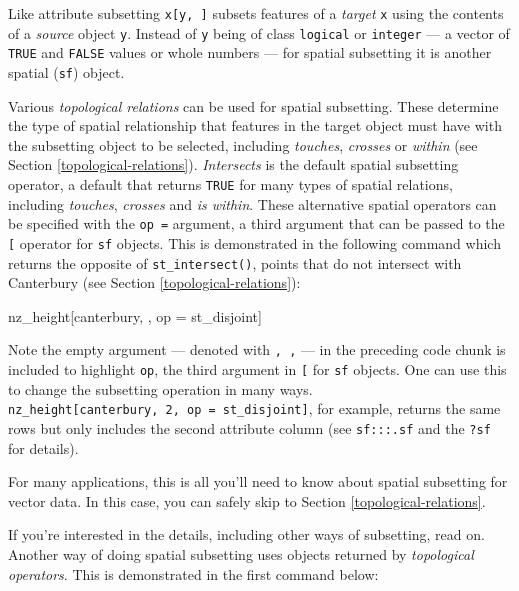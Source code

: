 \documentclass[]{krantz}
\newenvironment{Shaded}{\begin{snugshade}}{\end{snugshade}}
\newcommand{\NormalTok}[1]{#1}
\newcommand{\StringTok}[1]{\textcolor[rgb]{0.5,0.5,0.5}{#1}}
\let\BeginKnitrBlock\begin \let\EndKnitrBlock\end
\begin{document}
Like attribute subsetting \texttt{x{[}y,\ {]}} subsets features of a \emph{target} \texttt{x} using the contents of a \emph{source} object \texttt{y}.
Instead of \texttt{y} being of class \texttt{logical} or \texttt{integer} --- a vector of \texttt{TRUE} and \texttt{FALSE} values or whole numbers --- for spatial subsetting it is another spatial (\texttt{sf}) object.

Various \emph{topological relations} can be used for spatial subsetting.
These determine the type of spatial relationship that features in the target object must have with the subsetting object to be selected, including \emph{touches}, \emph{crosses} or \emph{within} (see Section \ref{topological-relations}).
\emph{Intersects} is the default spatial subsetting operator, a default that returns \texttt{TRUE} for many types of spatial relations, including \emph{touches}, \emph{crosses} and \emph{is within}.
These alternative spatial operators can be specified with the \texttt{op\ =} argument, a third argument that can be passed to the \texttt{{[}} operator for \texttt{sf} objects.
This is demonstrated in the following command which returns the opposite of \texttt{st\_intersect()}, points that do not intersect with Canterbury (see Section \ref{topological-relations}):

\begin{Shaded}
\begin{Highlighting}[]
\NormalTok{nz_height[canterbury, , op =}\StringTok{ }\NormalTok{st_disjoint]}
\end{Highlighting}
\end{Shaded}

\BeginKnitrBlock{rmdnote}
Note the empty argument --- denoted with \texttt{,\ ,} --- in the preceding code chunk is included to highlight \texttt{op}, the third argument in \texttt{{[}} for \texttt{sf} objects.
One can use this to change the subsetting operation in many ways.
\texttt{nz\_height{[}canterbury,\ 2,\ op\ =\ st\_disjoint{]}}, for example, returns the same rows but only includes the second attribute column (see \texttt{sf:::\textasciigrave{}{[}.sf\textasciigrave{}} and the \texttt{?sf} for details).
\EndKnitrBlock{rmdnote}

For many applications, this is all you'll need to know about spatial subsetting for vector data.
In this case, you can safely skip to Section \ref{topological-relations}.

If you're interested in the details, including other ways of subsetting, read on.
Another way of doing spatial subsetting uses objects returned by \emph{topological operators}.
This is demonstrated in the first command below:
\end{document}
